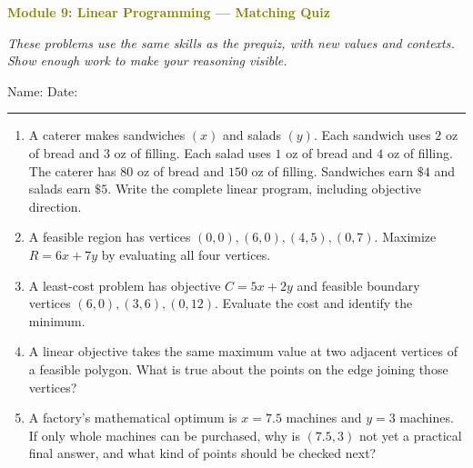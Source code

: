 \documentclass[11pt]{article}
\newcommand{\quizhead}[2]{%
  \clearpage
  {\Large\bfseries\textcolor{olive}{Module #1: #2 — Matching Quiz}}\par
  \textit{These problems use the same skills as the prequiz, with new values and contexts. Show enough work to make your reasoning visible.}\par
  Name: \hspace{2.6in} Date: \hspace{1.1in}\par
  \vspace{2pt}\textcolor{gold}{\rule{\linewidth}{1.2pt}}\par\smallskip
}
\newcommand{\workmed}{\par\vspace{0.62in}}
\newcommand{\worklarge}{\par\vspace{0.92in}}
\newcommand{\workxl}{\par\vspace{1.22in}}
\begin{document}
\quizhead{9}{Linear Programming}
\begin{enumerate}
\item A caterer makes sandwiches \((x)\) and salads \((y)\). Each sandwich uses \(2\) oz of bread and \(3\) oz of filling. Each salad uses \(1\) oz of bread and \(4\) oz of filling. The caterer has \(80\) oz of bread and \(150\) oz of filling. Sandwiches earn \(\$4\) and salads earn \(\$5\). Write the complete linear program, including objective direction.
\workxl

\item A feasible region has vertices \((0,0),(6,0),(4,5),(0,7)\). Maximize \(R=6x+7y\) by evaluating all four vertices.
\worklarge

\item A least-cost problem has objective \(C=5x+2y\) and feasible boundary vertices \((6,0),(3,6),(0,12)\). Evaluate the cost and identify the minimum.
\workmed

\item A linear objective takes the same maximum value at two adjacent vertices of a feasible polygon. What is true about the points on the edge joining those vertices?
\workmed

\item A factory's mathematical optimum is \(x=7.5\) machines and \(y=3\) machines. If only whole machines can be purchased, why is \((7.5,3)\) not yet a practical final answer, and what kind of points should be checked next?
\workmed
\end{enumerate}
\end{document}
